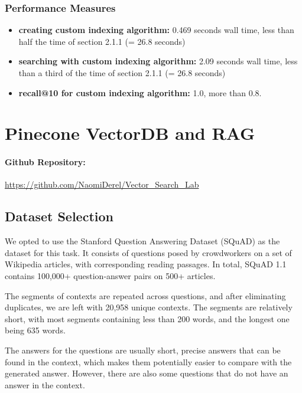 \documentclass[12pt]{article}
\begin{document}
\subsubsection*{Performance Measures}

\begin{itemize}
    \item \textbf{creating custom indexing algorithm:} 0.469 seconds wall time, less than half the time of section 2.1.1 (= 26.8 seconds)
    \item \textbf{searching with custom indexing algorithm:} 2.09 seconds wall time, less than a third of the time of section 2.1.1 (= 26.8 seconds)
    \item \textbf{recall@10 for custom indexing algorithm:} 1.0, more than 0.8.
\end{itemize}



\newpage

\section{Pinecone VectorDB and RAG}

\paragraph*{Github Repository:}
\url{https://github.com/NaomiDerel/Vector_Search_Lab}

\subsection{Dataset Selection}

We opted to use the Stanford Question Answering Dataset (SQuAD) as the dataset for this task. 
It consists of questions posed by crowdworkers on a set of Wikipedia articles, with corresponding reading passages.
In total, SQuAD 1.1 contains 100,000+ question-answer pairs on 500+ articles.

The segments of contexts are repeated across questions, and after eliminating duplicates, we are left with 20,958 unique contexts.
The segments are relatively short, with most segments containing less than 200 words, and the longest one being 635 words.

The answers for the questions are usually short, precise answers that can be found in the context, which makes them potentially easier to compare with the generated answer. However, there are also some questions that do not have an answer in the context.
\end{document}
